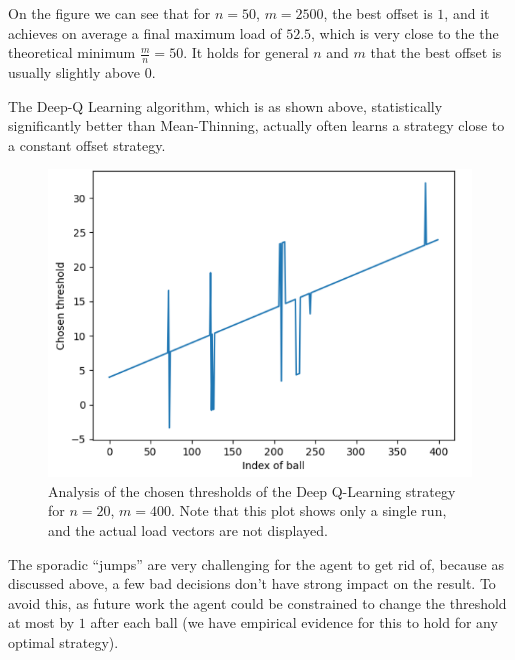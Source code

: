 
On the figure we can see that for $n=50$, $m=2500$, the best offset is $1$, and it achieves on average a final maximum load of $52.5$, which is very close to the the theoretical minimum $\frac{m}{n}=50$. It holds for general $n$ and $m$ that the best offset is usually slightly above $0$.

The Deep-Q Learning algorithm, which is as shown above, statistically significantly better than Mean-Thinning, actually often learns a strategy close to a constant offset strategy.


\begin{figure}[h] \label{two-thinning-dqn-thresholds}
    \centering
    \includegraphics[scale=0.6]{Chapter4/Figs/dqn_learnt_thresholds.png}
    \caption{Analysis of the chosen thresholds of the Deep Q-Learning strategy for $n=20$, $m=400$. Note that this plot shows only a single run, and the actual load vectors are not displayed.}
\end{figure}



The sporadic ``jumps'' are very challenging for the agent to get rid of, because as discussed above, a few bad decisions don't have strong impact on the result. To avoid this, as future work the agent could be constrained to change the threshold at most by $1$ after each ball (we have empirical evidence for this to hold for any optimal strategy).



